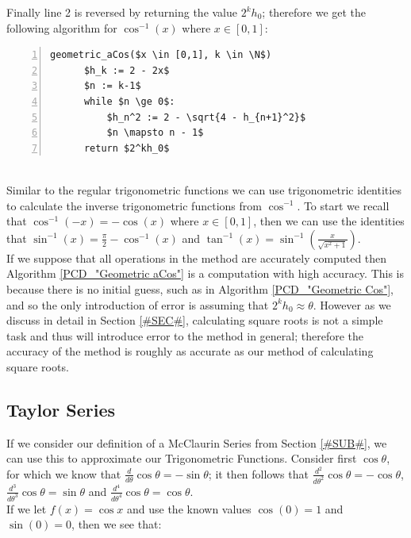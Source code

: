{Finally line 2 is reversed by returning the value \(2^kh_0\); therefore we get the following algorithm for \(\cos^{-1}(x)\) where \(x \in [0,1]\):

\begin{lstlisting}[numbers=left,frame=single,mathescape,caption={Geometric calculation of \(\cos^{-1}\)},label={PCD_"Geometric aCos"}]
  geometric_aCos($x \in [0,1], k \in \N$)
      $h_k := 2 - 2x$
      $n := k-1$
      while $n \ge 0$:
          $h_n^2 := 2 - \sqrt{4 - h_{n+1}^2}$
          $n \mapsto n - 1$
      return $2^kh_0$
\end{lstlisting}\\

Similar to the regular trigonometric functions we can use trigonometric identities to calculate the inverse trigonometric functions from \(\cos^{-1}\). To start we recall that \(\cos^{-1}(-x) = -\cos(x)\) where \(x \in [0,1]\), then we can use the identities that \(\sin^{-1}(x) = \frac{\pi}{2} - \cos^{-1}(x)\) and \(\tan^{-1}(x) = \sin^{-1}(\frac{x}{\sqrt{x^2 + 1}})\).\\

If we suppose that all operations in the method are accurately computed then Algorithm \ref{PCD_"Geometric aCos"} is a computation with high accuracy. This is because there is no initial guess, such as in Algorithm \ref{PCD_"Geometric Cos"}, and so the only introduction of error is assuming that \(2^kh_0 \approx \theta\). However as we discuss in detail in Section \ref{#SEC#}, calculating square roots is not a simple task and thus will introduce error to the method in general; therefore the accuracy of the method is roughly as accurate as our method of calculating square roots.

\subsection{Taylor Series}
\label{SUB_"Taylor Series Trig"}

If we consider our definition of a McClaurin Series from Section \ref{#SUB#}, we can use this to approximate our Trigonometric Functions. Consider first \(\cos\theta\), for which we know that \(\frac{d}{d\theta}\cos\theta = - \sin\theta\); it then follows that \(\frac{d^2}{d\theta^2}\cos\theta = -\cos\theta\), \(\frac{d^3}{d\theta^3} \cos\theta = \sin\theta\) and \(\frac{d^4}{d\theta^4} \cos\theta = \cos\theta\).\\

If we let \(f(x) = \cos x\) and use the known values \(\cos(0) = 1\) and \(\sin(0) = 0\), then we see that:

}
